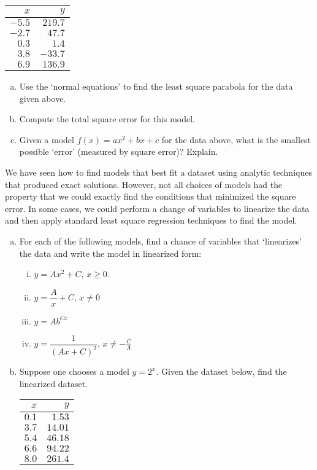 \documentclass[11pt,letterpaper]{article}
\begin{document}
	\begin{table}[!ht]
	\centering
	\begin{tabular}{r|r}
	$x$ & $y$ \\ \hline
	$-5.5$ & $219.7$ \\
	$-2.7$ & $47.7$ \\
	$0.3$ & $1.4$ \\
	$3.8$ & $-33.7$ \\
	$6.9$ & $136.9$ 
	\end{tabular}
	\end{table}

\begin{enumerate}[(a)]
\item Use the `normal equations' to find the least square parabola for the data given above. 
\item Compute the total square error for this model. 
\item Given a model $f(x)= ax^2 + bx + c$ for the data above, what is the smallest possible `error' (measured by square error)? Explain. 
\end{enumerate}



\newpage



 We have seen how to find models that best fit a dataset using analytic techniques that produced exact solutions. However, not all choices of models had the property that we could exactly find the conditions that minimized the square error. In some cases, we could perform a change of variables to linearize the data and then apply standard least square regression techniques to find the model. 
	\begin{enumerate}[(a)]
	\item For each of the following models, find a chance of variables that `linearizes' the data and write the model in linearized form:
		\begin{enumerate}[(i)]
		\item $y= Ax^2 + C$, $x \geq 0$. 
		\item $y= \dfrac{A}{x} + C$, $x \neq 0$
		\item $y= Ab^{Cx}$
		\item $y= \dfrac{1}{(Ax + C)^2}$, $x \neq -\frac{C}{A}$
		\end{enumerate}
	\item Suppose one chooses a model $y= 2^x$. Given the dataset below, find the linearized dataset. 
		\begin{table}[!ht]
		\centering
		\begin{tabular}{r|r}
		$x$ & $y$ \\ \hline
		$0.1$ & $1.53$ \\
		$3.7$ & $14.01$ \\
		$5.4$ & $46.18$ \\
		$6.6$ & $94.22$ \\
		$8.0$ & $261.4$
		\end{tabular}
		\end{table}
	\end{enumerate}
\end{document}
